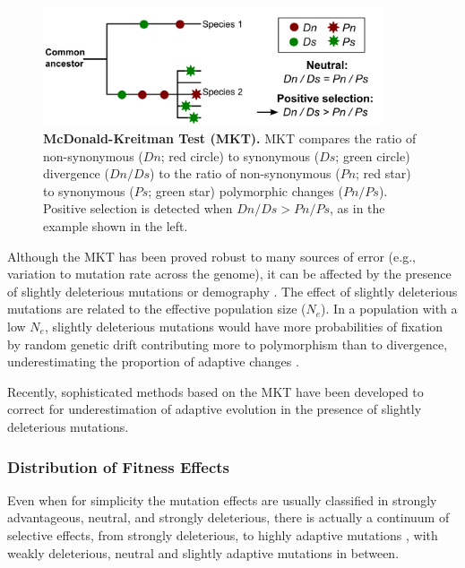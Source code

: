 \begin{figure}[h]
  \includegraphics[width=10cm]{./Images/MKT.png}
  \centering
  \caption{\textbf{McDonald-Kreitman Test (MKT).} MKT compares the ratio of non-synonymous ($Dn$; red circle) to synonymous ($Ds$; green circle) divergence ($Dn/Ds$) to the ratio of non-synonymous ($Pn$; red star) to synonymous ($Ps$; green star) polymorphic changes ($Pn/Ps$). Positive selection is detected when $Dn/Ds > Pn/Ps$, as in the example shown in the left.
   }
  \label{fig:MKT}
\end{figure}

Although the MKT has been proved robust to many sources of error (e.g., variation to mutation rate across the genome), it can be affected by the presence of slightly deleterious mutations or demography \citep{Messer2013,Eyre-Walker2006a}. 
%
The effect of slightly deleterious mutations are related to the effective population size ($N_{e}$). In a population with a low $N_{e}$, slightly deleterious mutations would have more probabilities of fixation by random genetic drift contributing more to polymorphism than to divergence, underestimating the proportion of adaptive changes \citep{Messer2013}.

Recently, sophisticated methods based on the MKT have been developed to correct for underestimation of adaptive evolution in the presence of slightly deleterious mutations. 


\subsubsection{Distribution of Fitness Effects}

Even when for simplicity the mutation effects are usually classified in strongly advantageous, neutral, and strongly deleterious, there is actually a continuum of selective effects, from strongly deleterious, 
to highly adaptive mutations	\citep{Eyre-Walker2007}, with weakly deleterious, neutral and slightly adaptive mutations in between.

